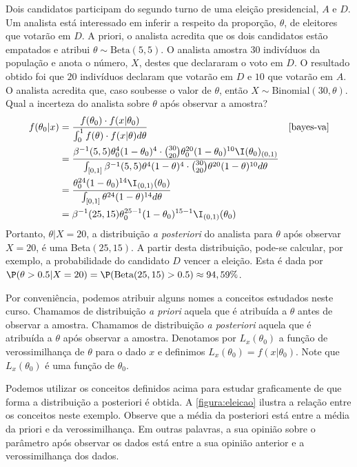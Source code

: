 \begin{example}
 \label{exemplo:eleicao}
 Dois candidatos participam do segundo turno de
 uma eleição presidencial, $A$ e $D$.
 Um analista está interessado em inferir a 
 respeito da proporção, $\theta$, de
 eleitores que votarão em $D$.
 A priori, o analista acredita que 
 os dois candidatos estão empatados e 
 atribui $\theta \sim \text{Beta}(5, 5)$.
 O analista amostra $30$ indivíduos da população e 
 anota o número, $X$, destes que 
 declararam o voto em $D$.
 O resultado obtido foi que 
 $20$ indivíduos declaram que votarão em $D$ e
 $10$ que votarão em $A$.
 O analista acredita que, 
 caso soubesse o valor de $\theta$,
 então $X \sim \text{Binomial}(30, \theta)$.
 Qual a incerteza do analista sobre 
 $\theta$ após observar a amostra?
 \begin{align*}
  f(\theta_{0}|x)	
  &= \frac{f(\theta_{0}) \cdot f(x|\theta_{0})}
  {\int_{0}^1{f(\theta) \cdot f(x|\theta)d\theta}}
  & \Cref{bayes-va}	\\
  &= \frac{\beta^{-1}(5,5)\theta_{0}^{4}(1-\theta_{0})^{4}
  \cdot {30 \choose 20}\theta_{0}^{20}(1-\theta_{0})^{10}\I(\theta_{0})_{(0,1)}}{\int_{[0,1]}{\beta^{-1}(5,5)\theta^{4}(1-\theta)^{4} \cdot {30 \choose 20}\theta^{20}(1-\theta)^{10}} d\theta} \\
  &= \frac{\theta_{0}^{24}(1-\theta_{0})^{14}\I_{(0,1)}(\theta_{0})}{\int_{[0,1]}\theta^{24}(1-\theta)^{14} d\theta} \\
  &= \beta^{-1}(25,15)\theta_{0}^{25-1}(1-\theta_{0})^{15-1}\I_{(0,1)}(\theta_{0})
 \end{align*}
 Portanto, $\theta|X=20$, a distribuição 
 \emph{a posteriori} do analista para 
 $\theta$ após observar $X=20$, é
 uma Beta$(25,15)$.
 A partir desta distribuição, pode-se calcular, por exemplo, a probabilidade do candidato $D$ vencer a eleição. Esta é dada por $\P(\theta>0.5|X=20)=\P(\mbox{Beta}(25,15)>0.5) \approx 94,59\%$.

 Por conveniência, podemos atribuir alguns 
 nomes a conceitos estudados neste curso.
 Chamamos de distribuição \emph{a priori} aquela que
 é atribuída a $\theta$ antes de observar a amostra.
 Chamamos de distribuição \emph{a posteriori} aquela que
 é atribuída a $\theta$ após observar a amostra.
 Denotamos por $L_{x}(\theta_{0})$ a
 função de verossimilhança de $\theta$ para
 o dado $x$ e definimos 
 $L_{x}(\theta_{0}) = f(x|\theta_{0})$.
 Note que $L_{x}(\theta_{0})$ é
 uma função de $\theta_{0}$.

 Podemos utilizar os conceitos definidos acima para
 estudar graficamente de que forma a
 distribuição a posteriori é obtida.
 A \cref{figura:eleicao} ilustra a
 relação entre os conceitos neste exemplo.
 Observe que a média da posteriori está entre
 a média da priori e da verossimilhança.
 Em outras palavras, a sua opinião sobre
 o parâmetro após observar os dados está entre
 a sua opinião anterior e a verossimilhança dos dados.
 

\end{example}
